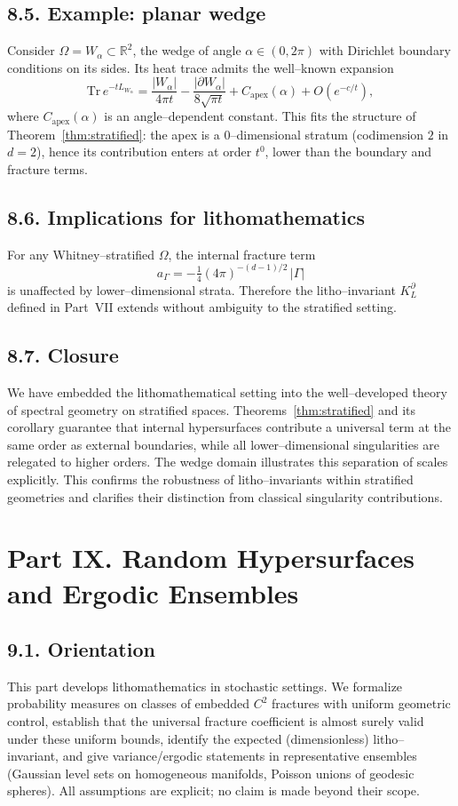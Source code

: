 \subsection*{8.5. Example: planar wedge}
Consider $\Omega=W_\alpha\subset\mathbb{R}^2$, the wedge of angle $\alpha\in(0,2\pi)$ with Dirichlet boundary conditions on its sides. Its heat trace admits the well–known expansion
\[
\mathrm{Tr}\,e^{-tL_{W_\alpha}}
= \frac{|W_\alpha|}{4\pi t}
-\frac{|\partial W_\alpha|}{8\sqrt{\pi t}}
+ C_{\mathrm{apex}}(\alpha) + O(e^{-c/t}),
\]
where $C_{\mathrm{apex}}(\alpha)$ is an angle–dependent constant. This fits the structure of Theorem~\ref{thm:stratified}: the apex is a $0$–dimensional stratum (codimension $2$ in $d=2$), hence its contribution enters at order $t^0$, lower than the boundary and fracture terms.

\subsection*{8.6. Implications for lithomathematics}
\begin{corollary}
For any Whitney–stratified $\Omega$, the internal fracture term
\[
a_\Gamma = -\tfrac14(4\pi)^{-(d-1)/2}\,|\Gamma|
\]
is unaffected by lower–dimensional strata. Therefore the litho–invariant $K_L^\partial$ defined in Part~VII extends without ambiguity to the stratified setting.
\end{corollary}

\subsection*{8.7. Closure}
We have embedded the lithomathematical setting into the well–developed theory of spectral geometry on stratified spaces. Theorems~\ref{thm:stratified} and its corollary guarantee that internal hypersurfaces contribute a universal term at the same order as external boundaries, while all lower–dimensional singularities are relegated to higher orders. The wedge domain illustrates this separation of scales explicitly. This confirms the robustness of litho–invariants within stratified geometries and clarifies their distinction from classical singularity contributions.

\section*{Part IX. Random Hypersurfaces and Ergodic Ensembles}

\subsection*{9.1. Orientation}
This part develops lithomathematics in stochastic settings. We formalize probability measures on classes of embedded $C^2$ fractures with uniform geometric control, establish that the universal fracture coefficient is almost surely valid under these uniform bounds, identify the expected (dimensionless) litho–invariant, and give variance/ergodic statements in representative ensembles (Gaussian level sets on homogeneous manifolds, Poisson unions of geodesic spheres). All assumptions are explicit; no claim is made beyond their scope.

